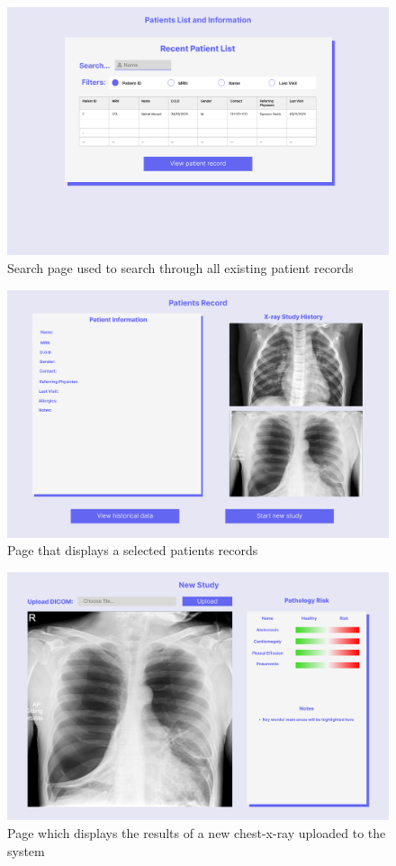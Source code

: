 \documentclass[12pt, titlepage]{article}
\begin{document}
\begin{figure}[H]
    \centering
    \includegraphics[scale=0.30]{chest-x-ray-ai (2).png}
    \caption{Search page used to search through all existing patient records}
    \label{fig:PatientSearchPage}
\end{figure}
\begin{figure}[H]
    \centering
    \includegraphics[scale=0.30]{chest-x-ray-ai (3).png}
    \caption{Page that displays a selected patients records}
    \label{fig:PatientRecordPage}
\end{figure}
\begin{figure}[H]
    \centering
    \includegraphics[scale=0.30]{chest-x-ray-ai (4).png}
    \caption{Page which displays the results of a new chest-x-ray uploaded to the system}
    \label{fig:NewStudeyPage}
\end{figure}
\end{document}
